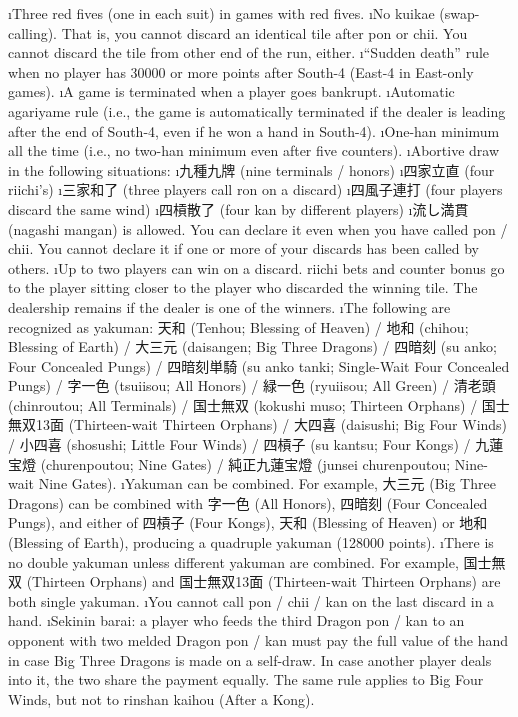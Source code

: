 \bi
\i Three red fives (one in each suit) in games with red fives.
\i No {\jap kuikae} (swap-calling). That is, you cannot discard an identical tile after {\jap pon} or {\jap chii}. You cannot discard the tile from other end of the run, either. 
\i ``Sudden death'' rule when no player has 30000 or more points after South-4 (East-4 in East-only games).
\i A game is terminated when a player goes bankrupt.
\i Automatic {\jap agariyame} rule (i.e., the game is automatically terminated if the dealer is leading after the end of South-4, even if he won a hand in South-4).
\i One-{\jap han} minimum all the time (i.e., no two-{\jap han} minimum even after five counters).
\i Abortive draw in the following situations:
	\bi
	\i 九種九牌 (nine terminals / honors)
	\i 四家立直 (four riichi's)
	\i 三家和了 (three players call {\jap ron} on a discard)
	\i 四風子連打 (four players discard the same wind)
	\i 四槓散了 (four {\jap kan} by different players)
	\ei
\i 流し満貫 ({\jap nagashi mangan}) is allowed. You can declare it even when you have called {\jap pon} / {\jap chii}. You cannot declare it if one or more of your discards has been called by others.
\i Up to two players can win on a discard. riichi bets and counter bonus go to the player sitting closer to the player who discarded the winning tile. The dealership remains if the dealer is one of the winners.
\i The following are recognized as {\jap yakuman}: 
天和 ({\jap Tenhou}; Blessing of Heaven) / 地和 ({\jap chihou}; Blessing of Earth) / 大三元 ({\jap daisangen}; Big Three Dragons) / 四暗刻 ({\jap su anko}; Four Concealed Pungs) / 四暗刻単騎 ({\jap su anko tanki}; Single-Wait Four Concealed Pungs) / 字一色 ({\jap tsuiisou}; All Honors) / 緑一色 ({\jap ryuiisou}; All Green) / 清老頭 ({\jap chinroutou}; All Terminals) / 国士無双 ({\jap kokushi muso}; Thirteen Orphans) / 国士無双13面 (Thirteen-wait Thirteen Orphans) / 大四喜 ({\jap daisushi}; Big Four Winds) / 小四喜 ({\jap shosushi}; Little Four Winds) / 四槓子 ({\jap su kantsu}; Four Kongs) / 九蓮宝燈 ({\jap churenpoutou}; Nine Gates) / 純正九蓮宝燈 ({\jap junsei churenpoutou}; Nine-wait Nine Gates).
\i {\jap Yakuman} can be combined. For example, 大三元 (Big Three Dragons) can be combined with 字一色 (All Honors), 四暗刻 (Four Concealed Pungs), and either of 四槓子 (Four Kongs), 天和 (Blessing of Heaven) or 地和 (Blessing of Earth), producing a quadruple {\jap yakuman} (128000 points). 
\i There is no double {\jap yakuman} unless different {\jap yakuman} are combined. For example, 国士無双 (Thirteen Orphans) and 国士無双13面 (Thirteen-wait Thirteen Orphans) are both single {\jap yakuman}. 
\i You cannot call {\jap pon} / {\jap chii} / {\jap kan} on the last discard in a hand. 
\i {\jap Sekinin barai}: a player who feeds the third Dragon {\jap pon} / {\jap kan} to an opponent with two melded Dragon {\jap pon} / {\jap kan} must pay the full value of the hand in case Big Three Dragons is made on a self-draw. In case another player deals into it, the two share the payment equally. The same rule applies to Big Four Winds, but not to {\jap rinshan kaihou} (After a Kong).  
\ei


